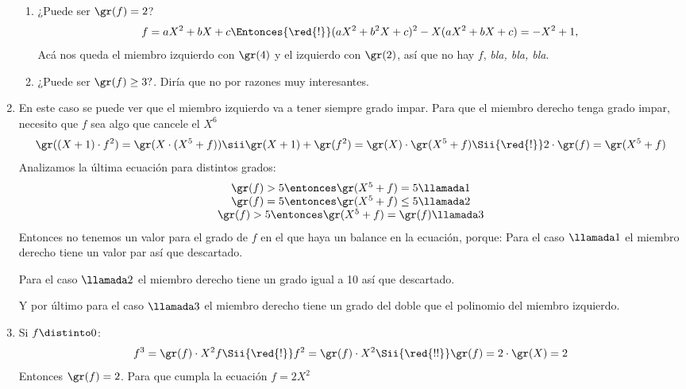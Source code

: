 \begin{enumerate}[label=\roman*)]
\begin{enumerate}[label=\tiny\faIcon{calculator}$_{\arabic*}$)]
          \item ¿Puede ser $\gr(f) = 2$?
                $$
                  f = aX^2 + bX + c \Entonces{\red{!}} (aX^2 + b^2X + c)^2  - X(aX^2 + bX + c) = -X^2 + 1,
                $$
                Acá nos queda el miembro izquierdo con $\gr(4)$ y el izquierdo con $\gr(2)$, así que no hay $f$, \textit{bla, bla, bla}.

          \item ¿Puede ser $\gr(f) \geq 3?$. Diría que no por razones muy interesantes.

        \end{enumerate}

  \item En este caso se puede ver que el miembro izquierdo va a tener siempre grado impar. Para que el miembro derecho tenga grado impar,
        necesito que $f$ sea algo que cancele el $X^6$
        $$
          \gr((X+1)\cdot f^2) = \gr(X\cdot (X^5 + f))
          \sii
          \gr(X+1) + \gr(f^2) = \gr(X) \cdot \gr(X^5 + f)
          \Sii{\red{!}}
          2 \cdot \gr(f) =\gr(X^5 + f)
        $$
        Analizamos la última ecuación para distintos grados:
        $$
          \begin{array}{c}
            \gr(f) > 5 \entonces \gr(X^5 + f) = 5 \llamada1    \\
            \gr(f) = 5 \entonces \gr(X^5 + f) \leq 5 \llamada2 \\
            \gr(f) > 5 \entonces \gr(X^5 + f) = \gr(f) \llamada3
          \end{array}
        $$
        Entonces no tenemos un valor para el grado de $f$ en el que haya un balance en la ecuación, porque:
        Para el caso $\llamada1$ el miembro derecho tiene un valor par
        así que descartado.\par
        Para el caso $\llamada2$ el miembro derecho tiene un grado igual a 10 así que descartado.\par
        Y por último para el caso $\llamada3$ el miembro derecho tiene un grado del doble que el polinomio del miembro izquierdo.\par

  \item Si $f \distinto 0$:
        $$
          f^3 = \gr(f) \cdot X^2f
          \Sii{\red{!}}
          f^2 = \gr(f) \cdot X^2
          \Sii{\red{!!}}
          \gr(f) = 2\cdot \gr(X) = 2
        $$
       Entonces $\gr(f) = 2$. Para que cumpla la ecuación $f = 2 X^2$ 
\end{enumerate}


\begin{aportes}
  \item {}
\end{aportes}
